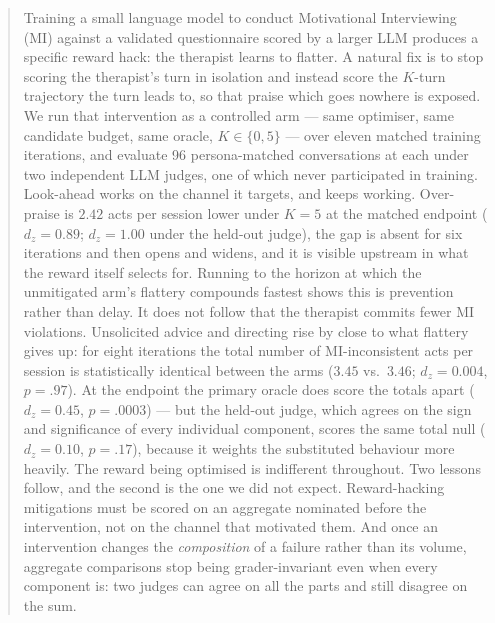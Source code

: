 \begin{abstract}
Training a small language model to conduct Motivational Interviewing (MI) against a validated
questionnaire scored by a larger LLM produces a specific reward hack: the therapist learns to
flatter. A natural fix is to stop scoring the therapist's turn in isolation and instead score the
$K$-turn trajectory the turn leads to, so that praise which goes nowhere is exposed. We run that
intervention as a controlled arm --- same optimiser, same candidate budget, same oracle, $K \in
\{0, 5\}$ --- over eleven matched training iterations, and evaluate 96 persona-matched
conversations at each under two independent LLM judges, one of which never participated in
training.
%
Look-ahead works on the channel it targets, and keeps working. Over-praise is $2.42$ acts per
session lower under $K{=}5$ at the matched endpoint ($d_z{=}0.89$; $d_z{=}1.00$ under the held-out
judge), the gap is absent for six iterations and then opens and widens, and it is visible upstream
in what the reward itself selects for. Running to the horizon at which the unmitigated arm's
flattery compounds fastest shows this is prevention rather than delay.
%
It does not follow that the therapist commits fewer MI violations. Unsolicited advice and
directing rise by close to what flattery gives up: for eight iterations the total number of
MI-inconsistent acts per session is statistically identical between the arms ($3.45$ vs.\ $3.46$;
$d_z{=}0.004$, $p{=}.97$). At the endpoint the primary oracle does score the totals apart
($d_z{=}0.45$, $p{=}.0003$) --- but the held-out judge, which agrees on the sign and significance
of every individual component, scores the same total null ($d_z{=}0.10$, $p{=}.17$), because it
weights the substituted behaviour more heavily. The reward being optimised is indifferent
throughout.
%
Two lessons follow, and the second is the one we did not expect. Reward-hacking mitigations must be
scored on an aggregate nominated before the intervention, not on the channel that motivated them.
And once an intervention changes the \emph{composition} of a failure rather than its volume,
aggregate comparisons stop being grader-invariant even when every component is: two judges can
agree on all the parts and still disagree on the sum.
\end{abstract}
